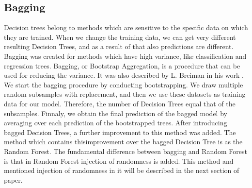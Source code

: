 \subsection{Bagging}
Decision trees belong to methods which are sensitive to the specific data on which they are trained. 
When we change the training data, we can get very different resulting Decision Trees, 
and as a result of that also predictions are different. 
Bagging was created for methods which have high variance, like classification and regression trees.
Bagging, or Bootstrap Aggregation, is a procedure that can be used for reducing the variance.
It was also described by L. Breiman in his work \cite{breiman1996bagging}.
We start the bagging procedure by conducting bootstrapping.
We draw multiple random subsamples with replacement,
and then we use these datasets as training data for our model.
Therefore, the number of Decision Trees equal that of the subsamples. 
Finnaly, we obtain the final prediction of the bagged model by averaging over each prediction of the bootstrapped trees.
After introducing bagged Decision Trees, a further improvement to this method was added. 
The method which contains thisimprovement over the bagged Decision Tree is as the Random Forest. 
The fundamental difference between bagging and Random Forest is 
that in Random Forest injection of randomness is added. 
This method and mentioned injection of randomness in it will be described in the next section of paper.
